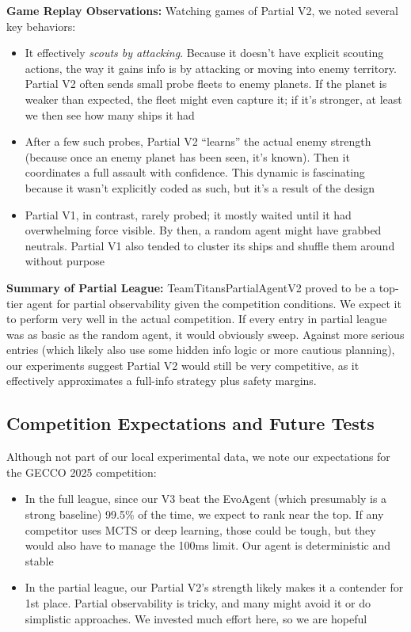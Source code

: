 \documentclass[conference]{IEEEtran}
\begin{document}
\textbf{Game Replay Observations:} Watching games of Partial V2, we noted several key behaviors:
\begin{itemize}
\item It effectively \textit{scouts by attacking}. Because it doesn't have explicit scouting actions, the way it gains info is by attacking or moving into enemy territory. Partial V2 often sends small probe fleets to enemy planets. If the planet is weaker than expected, the fleet might even capture it; if it's stronger, at least we then see how many ships it had
\item After a few such probes, Partial V2 ``learns'' the actual enemy strength (because once an enemy planet has been seen, it's known). Then it coordinates a full assault with confidence. This dynamic is fascinating because it wasn't explicitly coded as such, but it's a result of the design
\item Partial V1, in contrast, rarely probed; it mostly waited until it had overwhelming force visible. By then, a random agent might have grabbed neutrals. Partial V1 also tended to cluster its ships and shuffle them around without purpose
\end{itemize}

\textbf{Summary of Partial League:} TeamTitansPartialAgentV2 proved to be a top-tier agent for partial observability given the competition conditions. We expect it to perform very well in the actual competition. If every entry in partial league was as basic as the random agent, it would obviously sweep. Against more serious entries (which likely also use some hidden info logic or more cautious planning), our experiments suggest Partial V2 would still be very competitive, as it effectively approximates a full-info strategy plus safety margins.

\subsection{Competition Expectations and Future Tests}

Although not part of our local experimental data, we note our expectations for the GECCO 2025 competition:
\begin{itemize}
\item In the full league, since our V3 beat the EvoAgent (which presumably is a strong baseline) 99.5\% of the time, we expect to rank near the top. If any competitor uses MCTS or deep learning, those could be tough, but they would also have to manage the 100ms limit. Our agent is deterministic and stable
\item In the partial league, our Partial V2's strength likely makes it a contender for 1st place. Partial observability is tricky, and many might avoid it or do simplistic approaches. We invested much effort here, so we are hopeful
\end{itemize}
\end{document}
